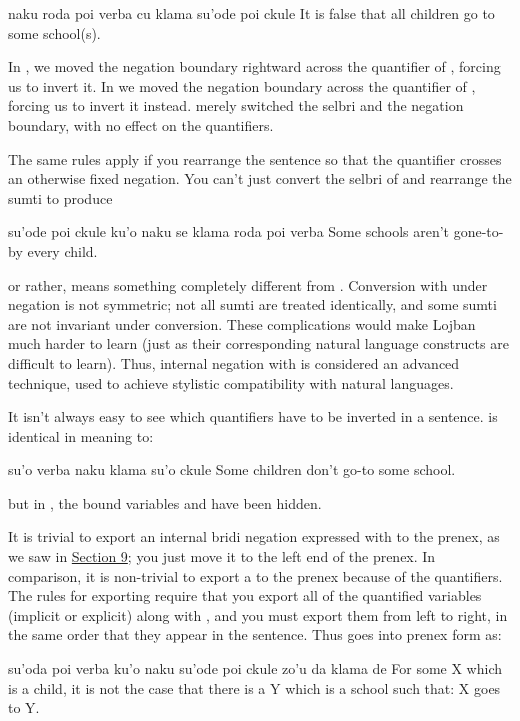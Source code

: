 \begin{example}
naku roda poi verba cu klama su'ode poi ckule\n
It is false that all children go to some school(s).
\end{example}

In , we moved the negation
    boundary rightward across the quantifier of , forcing us
    to invert it. In  we moved the
    negation boundary across the quantifier of , forcing us
    to invert it instead.  merely
    switched the selbri and the negation boundary, with no effect
    on the quantifiers.

The same rules apply if you rearrange the sentence so that
    the quantifier crosses an otherwise fixed negation. You can't
    just convert the selbri of 
    and rearrange the sumti to produce
\begin{example}
su'ode poi ckule ku'o naku se klama roda poi verba\n
Some schools aren't gone-to-by every child.
\end{example}

{\noindent}or rather,  means something
    completely different from .
    Conversion with  under  negation is not
    symmetric; not all sumti are treated identically, and some
    sumti are not invariant under conversion. These complications
    would make Lojban much harder to learn (just as their
    corresponding natural language constructs are difficult to
    learn). Thus, internal negation with  is considered an
    advanced technique, used to achieve stylistic compatibility
    with natural languages. 

It isn't always easy to see which quantifiers have to be
    inverted in a sentence.  is
    identical in meaning to:
\begin{example}
su'o verba naku klama su'o ckule\n
Some children don't go-to some school.
\end{example}

{\noindent}but in , the bound variables
     and  have been hidden. 

It is trivial to export an internal bridi negation expressed
    with  to the prenex, as we saw in \hyperref[sec:16:9]{Section
    9}; you just move it to the left end of the prenex. In
    comparison, it is non-trivial to export a  to the
    prenex because of the quantifiers. The rules for exporting
     require that you export all of the quantified
    variables (implicit or explicit) along with , and you
    must export them from left to right, in the same order that
    they appear in the sentence. Thus  goes into prenex form as:
\begin{example}
su'oda poi verba ku'o naku\n
\T	su'ode poi ckule zo'u\n
\T	da klama de\n
For some X which is a child, it is not the case that\n
\T	there is a Y which is a school such that:\n
\T	X goes to Y.
\end{example}

